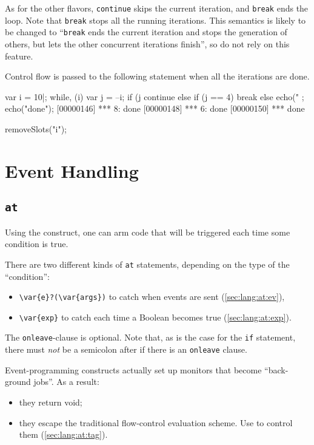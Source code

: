 As for the other flavors, \lstinline{continue} skips the current iteration,
and \lstinline{break} ends the loop.  Note that \lstinline{break} stops all
the running iterations.  This semantics is likely to be changed to
``\lstinline{break} ends the current iteration and stops the generation of
others, but lets the other concurrent iterations finish'', so do not rely on
this feature.

Control flow is passed to the following statement when all the iterations
are done.

\begin{urbiscript}
var i = 10|;
while, (i)
{
  var j = --i;
  if (j %
    continue
  else if (j == 4)
    break
  else
    echo("%
};
echo("done");
[00000146] *** 8: done
[00000148] *** 6: done
[00000150] *** done
\end{urbiscript}
\begin{urbicomment}
removeSlots("i");
\end{urbicomment}


\section{Event Handling}
\label{sec:lang:event}
\subsection{\lstinline{at}}
\label{sec:lang:at}
Using the  construct, one can arm code that will be
triggered each time some condition is true.



There are two different kinds of \lstinline{at} statements, depending on the
type of the ``condition'':
\begin{itemize}
\item \lstinline|\var{e}?(\var{args})| to catch when events are sent
  (\autoref{sec:lang:at:ev}),
\item \lstinline|\var{exp}| to catch each time a Boolean  becomes
  true (\autoref{sec:lang:at:exp}).
\end{itemize}

The \lstinline{onleave}-clause is optional.  Note that, as is the case for
the \lstinline{if} statement, there must \emph{not} be a semicolon after
 if there is an \lstinline{onleave} clause.

Event-programming constructs actually set up monitors that become
``back-ground jobs''.  As a result:
\begin{itemize}
\item they return void;
\item they escape the traditional flow-control evaluation scheme.  Use
   to control them (\autoref{sec:lang:at:tag}).
\end{itemize}

